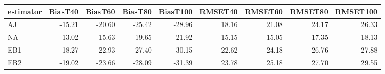 \begin{table}[ht]
\centering
\begin{tabular}{lrrrrrrrr}
  \toprule
estimator & BiasT40 & BiasT60 & BiasT80 & BiasT100 & RMSET40 & RMSET60 & RMSET80 & RMSET100 \\ 
  \midrule
AJ & -15.21 & -20.60 & -25.42 & -28.96 & 18.16 & 21.08 & 24.17 & 26.33 \\ 
  NA & -13.02 & -15.63 & -19.65 & -21.92 & 15.15 & 15.05 & 17.35 & 18.13 \\ 
  EB1 & -18.27 & -22.93 & -27.40 & -30.15 & 22.62 & 24.18 & 26.76 & 27.88 \\ 
  EB2 & -19.02 & -23.66 & -28.09 & -31.39 & 23.78 & 25.18 & 27.70 & 29.55 \\ 
   \bottomrule
\end{tabular}
\end{table}
